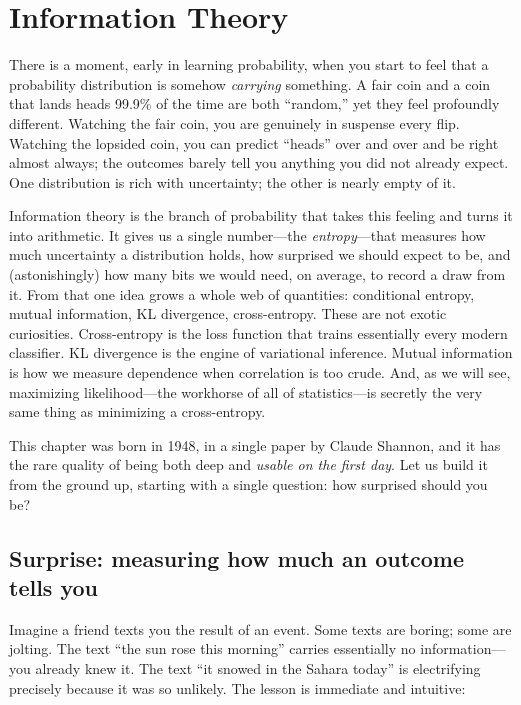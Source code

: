 \chapter{Information Theory}

There is a moment, early in learning probability, when you start to feel that a probability distribution
is somehow \emph{carrying} something. A fair coin and a coin that lands heads 99.9\% of the time are both
``random,'' yet they feel profoundly different. Watching the fair coin, you are genuinely in suspense
every flip. Watching the lopsided coin, you can predict ``heads'' over and over and be right almost
always; the outcomes barely tell you anything you did not already expect. One distribution is rich with
uncertainty; the other is nearly empty of it.

Information theory is the branch of probability that takes this feeling and turns it into arithmetic. It
gives us a single number---the \emph{entropy}---that measures how much uncertainty a distribution holds,
how surprised we should expect to be, and (astonishingly) how many bits we would need, on average, to
record a draw from it. From that one idea grows a whole web of quantities: conditional entropy, mutual
information, KL divergence, cross-entropy. These are not exotic curiosities. Cross-entropy is the loss
function that trains essentially every modern classifier. KL divergence is the engine of variational
inference. Mutual information is how we measure dependence when correlation is too crude. And, as we will
see, maximizing likelihood---the workhorse of all of statistics---is secretly the very same thing as
minimizing a cross-entropy.

This chapter was born in 1948, in a single paper by Claude Shannon, and it has the rare quality of being
both deep and \emph{usable on the first day}. Let us build it from the ground up, starting with a single
question: how surprised should you be?

\chapterline

\section{Surprise: measuring how much an outcome tells you}
\label{ch33:surprise}

Imagine a friend texts you the result of an event. Some texts are boring; some are jolting. The text
``the sun rose this morning'' carries essentially no information---you already knew it. The text ``it
snowed in the Sahara today'' is electrifying precisely because it was so unlikely. The lesson is immediate
and intuitive:

